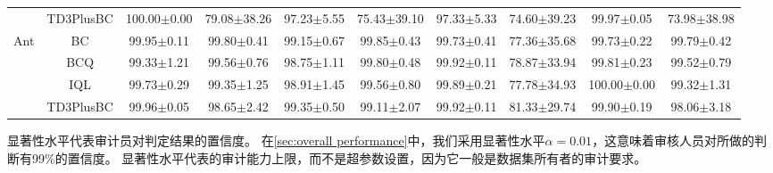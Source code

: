 \begin{table}[!ht]
\begin{tabular}{cccccccccc}
                                                                                           & TD3PlusBC                                                                                  & 100.00$\pm$0.00 & 79.08$\pm$38.26 & 97.23$\pm$5.55 & 75.43$\pm$39.10 & 97.33$\pm$5.33  & 74.60$\pm$39.23                             & 99.97$\pm$0.05  & 73.98$\pm$38.98                                   \\ 
    \cline{2-10}
    \multirow{4}{*}{Ant}                                                                   & BC                                                                                         & 99.95$\pm$0.11  & 99.80$\pm$0.41  & 99.15$\pm$0.67 & 99.85$\pm$0.43  & 99.73$\pm$0.41  & 77.36$\pm$35.68                             & 99.73$\pm$0.22  & 99.79$\pm$0.42                                    \\
                                                                                           & BCQ                                                                                        & 99.33$\pm$1.21  & 99.56$\pm$0.76  & 98.75$\pm$1.11 & 99.80$\pm$0.48  & 99.92$\pm$0.11  & 78.87$\pm$33.94                             & 99.81$\pm$0.23  & 99.52$\pm$0.79                                    \\
                                                                                           & IQL                                                                                        & 99.73$\pm$0.29  & 99.35$\pm$1.25  & 98.91$\pm$1.45 & 99.56$\pm$0.80  & 99.89$\pm$0.21  & 77.78$\pm$34.93                             & 100.00$\pm$0.00 & 99.32$\pm$1.31                                    \\
                                                                                           & TD3PlusBC                                                                                  & 99.96$\pm$0.05  & 98.65$\pm$2.42  & 99.35$\pm$0.50 & 99.11$\pm$2.07  & 99.92$\pm$0.11  & 81.33$\pm$29.74                             & 99.90$\pm$0.19  & 98.06$\pm$3.18                                    \\
    \bottomrule
    \end{tabular}
\end{table}

显著性水平代表审计员对判定结果的置信度。
在\autoref{sec:overall performance}中，我们采用显著性水平$\alpha=0.01$，这意味着审核人员对所做的判断有99\%的置信度。
显著性水平代表\sysnameo 的审计能力上限，而不是超参数设置，因为它一般是数据集所有者的审计要求。


